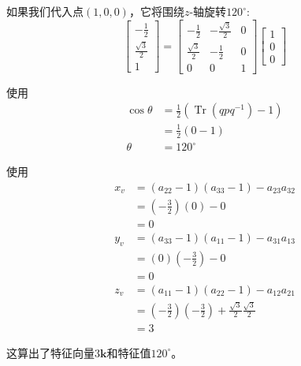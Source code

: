 \begin{example}
    如果我们代入点$(1,0,0)$，它将围绕$z$-轴旋转$120^{\circ}$:
    $$
    \left[\begin{array}{c}
    -\frac{1}{2} \\
    \frac{\sqrt{3}}{2} \\
    1
    \end{array}\right]=\left[\begin{array}{ccc}
    -\frac{1}{2} & -\frac{\sqrt{3}}{2} & 0 \\
    \frac{\sqrt{3}}{2} & -\frac{1}{2} & 0 \\
    0 & 0 & 1
    \end{array}\right]\left[\begin{array}{l}
    1 \\
    0 \\
    0
    \end{array}\right]
    $$
    
    使用 
    $$
    \begin{aligned}
    \cos \theta & =\frac{1}{2}\left(\operatorname{Tr}\left(q p q^{-1}\right)-1\right) \\
    & =\frac{1}{2}(0-1) \\
    \theta & =120^{\circ}
    \end{aligned}
    $$
    
    使用
    $$
    \begin{aligned}
    x_{v} & =\left(a_{22}-1\right)\left(a_{33}-1\right)-a_{23} a_{32} \\
    & =\left(-\frac{3}{2}\right)(0)-0 \\
    & =0 \\
    y_{v} & =\left(a_{33}-1\right)\left(a_{11}-1\right)-a_{31} a_{13} \\
    & =(0)\left(-\frac{3}{2}\right)-0 \\
    & =0 \\
    z_{v} & =\left(a_{11}-1\right)\left(a_{22}-1\right)-a_{12} a_{21} \\
    & =\left(-\frac{3}{2}\right)\left(-\frac{3}{2}\right)+\frac{\sqrt{3}}{2} \frac{\sqrt{3}}{2} \\
    & =3
    \end{aligned}
    $$
    
    这算出了特征向量$3 \mathbf{k}$和特征值$120^{\circ}$。
\end{example}

